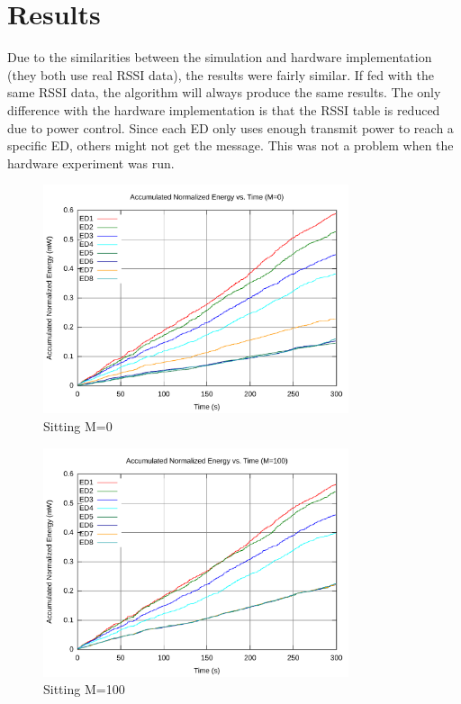 \documentclass{article}
\begin{document}
\section{Results}

Due to the similarities between the simulation and hardware implementation (they both use real RSSI data), the results were fairly similar. If fed with the same RSSI data, the algorithm will always produce the same results. The only difference with the hardware implementation is that the RSSI table is reduced due to power control. Since each ED only uses enough transmit power to reach a specific ED, others might not get the message. This was not a problem when the hardware experiment was run.

\begin{figure}[!ht]
\includegraphics[width=0.8\textwidth]{figures/sit1-c0.pdf}
\caption{Sitting M=0}
\label{fig:sit1-c0}
\end{figure}

\begin{figure}[!ht]
\includegraphics[width=0.8\textwidth]{figures/sit1-c100.pdf}
\caption{Sitting M=100}
\label{fig:sit1-c100}
\end{figure}
\end{document}
